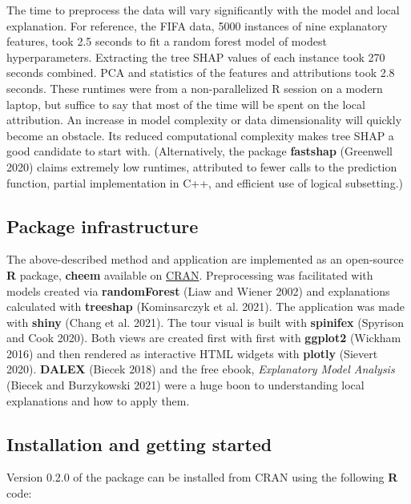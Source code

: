 \documentclass[
]{article}
\begin{document}
The time to preprocess the data will vary significantly with the model and local explanation. For reference, the FIFA data, 5000 instances of nine explanatory features, took 2.5 seconds to fit a random forest model of modest hyperparameters. Extracting the tree SHAP values of each instance took 270 seconds combined. PCA and statistics of the features and attributions took 2.8 seconds. These runtimes were from a non-parallelized R session on a modern laptop, but suffice to say that most of the time will be spent on the local attribution. An increase in model complexity or data dimensionality will quickly become an obstacle. Its reduced computational complexity makes tree SHAP a good candidate to start with. (Alternatively, the package \textbf{fastshap} (Greenwell 2020) claims extremely low runtimes, attributed to fewer calls to the prediction function, partial implementation in C++, and efficient use of logical subsetting.)

\hypertarget{sec:infrastructure}{%
\subsection{Package infrastructure}\label{sec:infrastructure}}

The above-described method and application are implemented as an open-source \textbf{R} package, \textbf{cheem} available on \href{https://CRAN.R-project.org/package=cheem}{CRAN}. Preprocessing was facilitated with models created via \textbf{randomForest} (Liaw and Wiener 2002) and explanations calculated with \textbf{treeshap} (Kominsarczyk et al. 2021). The application was made with \textbf{shiny} (Chang et al. 2021). The tour visual is built with \textbf{spinifex} (Spyrison and Cook 2020). Both views are created first with first with \textbf{ggplot2} (Wickham 2016) and then rendered as interactive HTML widgets with \textbf{plotly} (Sievert 2020). \textbf{DALEX} (Biecek 2018) and the free ebook, \emph{Explanatory Model Analysis} (Biecek and Burzykowski 2021) were a huge boon to understanding local explanations and how to apply them.

\hypertarget{installation-and-getting-started}{%
\subsection{Installation and getting started}\label{installation-and-getting-started}}

Version 0.2.0 of the package can be installed from CRAN using the following \textbf{R} code:
\end{document}
